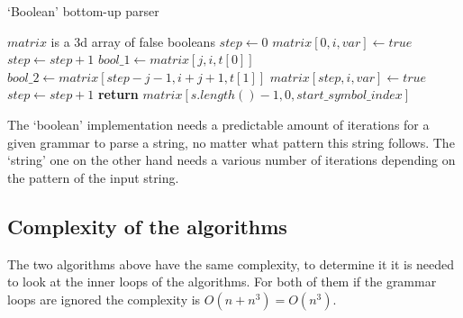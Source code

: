 \FloatBarrier
\begin{algorithm}
    \caption{`Boolean' bottom-up parser}
    \label{parse}
    \begin{algorithmic}[1]
         
            \State $matrix$ is a 3d array of false booleans
            \State $step \gets 0$
                            \State $matrix[0, i, var] \gets true$
                        \EndIf
                    \EndFor
                \EndFor
            \EndFor
            \State $step \gets step + 1$
                                \State $bool\_1 \gets matrix[j, i, t[0]]$
                                \State $bool\_2 \gets matrix[step - j - 1, i + j + 1, t[1]]$
                                    \State $matrix[step, i, var] \gets true$
                                \EndIf
                            \EndFor
                        \EndFor
                    \EndFor
                \EndFor
                \State $step \gets step + 1$
            \EndWhile
            \State \textbf{return} $matrix[s.length() - 1, 0, start\_symbol\_index]$
        \EndProcedure
    \end{algorithmic}
\end{algorithm}
\FloatBarrier

The `boolean' implementation needs a predictable amount of iterations for a given grammar to parse a string, no matter what pattern this string follows.
The `string' one on the other hand needs a various number of iterations depending on the pattern of the input string.

\subsection{Complexity of the algorithms}

The two algorithms above have the same complexity, to determine it it is needed to look at the inner loops of the algorithms.
For both of them if the grammar loops are ignored the complexity is $O(n + n^3) = O(n^3)$.

